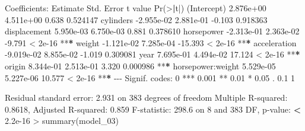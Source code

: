 \documentclass[
]{article}
\newenvironment{Shaded}{\begin{snugshade}}{\end{snugshade}}
\newcommand{\DecValTok}[1]{\textcolor[rgb]{0.00,0.00,0.81}{#1}}
\newcommand{\ErrorTok}[1]{\textcolor[rgb]{0.64,0.00,0.00}{\textbf{#1}}}
\newcommand{\FloatTok}[1]{\textcolor[rgb]{0.00,0.00,0.81}{#1}}
\newcommand{\FunctionTok}[1]{\textcolor[rgb]{0.00,0.00,0.00}{#1}}
\newcommand{\NormalTok}[1]{#1}
\newcommand{\SpecialCharTok}[1]{\textcolor[rgb]{0.00,0.00,0.00}{#1}}
\newcommand{\StringTok}[1]{\textcolor[rgb]{0.31,0.60,0.02}{#1}}
\begin{document}
\begin{Shaded}
\begin{Highlighting}[]
\NormalTok{Coefficients}\SpecialCharTok{:}
\NormalTok{                    Estimate Std. Error t value }\FunctionTok{Pr}\NormalTok{(}\SpecialCharTok{\textgreater{}}\ErrorTok{|}\NormalTok{t}\SpecialCharTok{|}\NormalTok{)    }
\NormalTok{(Intercept)        }\FloatTok{2.876e+00}  \FloatTok{4.511e+00}   \FloatTok{0.638} \FloatTok{0.524147}    
\NormalTok{cylinders         }\SpecialCharTok{{-}}\FloatTok{2.955e{-}02}  \FloatTok{2.881e{-}01}  \SpecialCharTok{{-}}\FloatTok{0.103} \FloatTok{0.918363}    
\NormalTok{displacement       }\FloatTok{5.950e{-}03}  \FloatTok{6.750e{-}03}   \FloatTok{0.881} \FloatTok{0.378610}    
\NormalTok{horsepower        }\SpecialCharTok{{-}}\FloatTok{2.313e{-}01}  \FloatTok{2.363e{-}02}  \SpecialCharTok{{-}}\FloatTok{9.791}  \SpecialCharTok{\textless{}} \FloatTok{2e{-}16} \SpecialCharTok{**}\ErrorTok{*}
\NormalTok{weight            }\SpecialCharTok{{-}}\FloatTok{1.121e{-}02}  \FloatTok{7.285e{-}04} \SpecialCharTok{{-}}\FloatTok{15.393}  \SpecialCharTok{\textless{}} \FloatTok{2e{-}16} \SpecialCharTok{**}\ErrorTok{*}
\NormalTok{acceleration      }\SpecialCharTok{{-}}\FloatTok{9.019e{-}02}  \FloatTok{8.855e{-}02}  \SpecialCharTok{{-}}\FloatTok{1.019} \FloatTok{0.309081}    
\NormalTok{year               }\FloatTok{7.695e{-}01}  \FloatTok{4.494e{-}02}  \FloatTok{17.124}  \SpecialCharTok{\textless{}} \FloatTok{2e{-}16} \SpecialCharTok{**}\ErrorTok{*}
\NormalTok{origin             }\FloatTok{8.344e{-}01}  \FloatTok{2.513e{-}01}   \FloatTok{3.320} \FloatTok{0.000986} \SpecialCharTok{**}\ErrorTok{*}
\NormalTok{horsepower}\SpecialCharTok{:}\NormalTok{weight  }\FloatTok{5.529e{-}05}  \FloatTok{5.227e{-}06}  \FloatTok{10.577}  \SpecialCharTok{\textless{}} \FloatTok{2e{-}16} \SpecialCharTok{**}\ErrorTok{*}
\SpecialCharTok{{-}{-}{-}}
\NormalTok{Signif. codes}\SpecialCharTok{:}  \DecValTok{0} \StringTok{\textquotesingle{}***\textquotesingle{}} \FloatTok{0.001} \StringTok{\textquotesingle{}**\textquotesingle{}} \FloatTok{0.01} \StringTok{\textquotesingle{}*\textquotesingle{}} \FloatTok{0.05} \StringTok{\textquotesingle{}.\textquotesingle{}} \FloatTok{0.1} \StringTok{\textquotesingle{} \textquotesingle{}} \DecValTok{1}

\NormalTok{Residual standard error}\SpecialCharTok{:} \FloatTok{2.931}\NormalTok{ on }\DecValTok{383}\NormalTok{ degrees of freedom}
\NormalTok{Multiple R}\SpecialCharTok{{-}}\NormalTok{squared}\SpecialCharTok{:}  \FloatTok{0.8618}\NormalTok{,    Adjusted R}\SpecialCharTok{{-}}\NormalTok{squared}\SpecialCharTok{:}  \FloatTok{0.859} 
\NormalTok{F}\SpecialCharTok{{-}}\NormalTok{statistic}\SpecialCharTok{:} \FloatTok{298.6}\NormalTok{ on }\DecValTok{8}\NormalTok{ and }\DecValTok{383}\NormalTok{ DF,  p}\SpecialCharTok{{-}}\NormalTok{value}\SpecialCharTok{:} \ErrorTok{\textless{}} \FloatTok{2.2e{-}16}
\SpecialCharTok{\textgreater{}} \FunctionTok{summary}\NormalTok{(model\_03)}


\end{Highlighting}
\end{Shaded}
\end{document}
